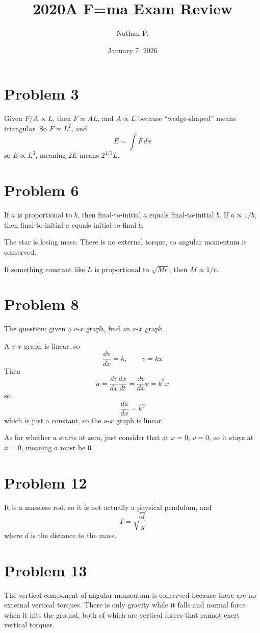 \documentclass[11pt]{article}
\title{2020A F=ma Exam Review}
\author{Nathan P.}
\date{January 7, 2026}
\begin{document}
\maketitle

\section*{Problem 3}
Given $F/A\propto L$, then $F\propto AL$, and $A\propto L$ because ``wedge-shaped'' means triangular. So $F\propto L^2$, and
\[
E=\int F\,dx
\]
so $E\propto L^3$, meaning $2E$ means $2^{1/3}L$.

\section*{Problem 6}
If $a$ is proportional to $b$, then final-to-initial $a$ equals final-to-initial $b$. If $a\propto 1/b$, then final-to-initial $a$ equals initial-to-final $b$.

The star is losing mass. There is no external torque, so angular momentum is conserved.

If something constant like $L$ is proportional to $\sqrt{Mr}$, then $M\propto 1/r$.

\section*{Problem 8}
The question: given a $v$-$x$ graph, find an $a$-$x$ graph.

A $v$-$x$ graph is linear, so
\[
\frac{dv}{dx}=k, \qquad v=kx
\]
Then
\[
a=\frac{dv}{dx}\frac{dx}{dt}=\frac{dv}{dx}v=k^2x
\]
so
\[
\frac{da}{dx}=k^2
\]
which is just a constant, so the $a$-$x$ graph is linear.

As for whether $a$ starts at zero, just consider that at $x=0$, $v=0$, so it stays at $x=0$, meaning $a$ must be $0$.

\section*{Problem 12}
It is a massless rod, so it is not actually a physical pendulum, and
\[
T=\sqrt{\frac{d}{g}}
\]
where $d$ is the distance to the mass.

\section*{Problem 13}
The vertical component of angular momentum is conserved because there are no external vertical torques. There is only gravity while it falls and normal force when it hits the ground, both of which are vertical forces that cannot exert vertical torques.
\end{document}
